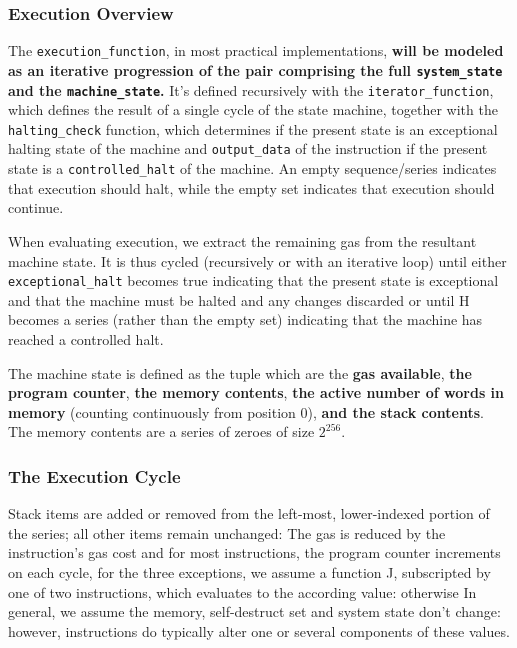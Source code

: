 \documentclass[10pt,letterpaper,leqno,bibliography=totoc]{scrartcl}
\newenvironment{alphafootnotes}
{\par\edef\savedfootnotenumber{\number\value{footnote}}
\renewcommand{\thefootnote}{\alph{footnote}}
\setcounter{footnote}{0}}
{\par\setcounter{footnote}{\savedfootnotenumber}}
\begin{document}
\begin{alphafootnotes}
\begin{multicols*}{2}
				\subsubsection{Execution Overview} The \texttt{execution\_function}, in most practical implementations, \textbf{will be modeled as an iterative progression of the pair comprising the full \texttt{system\_state} and the \texttt{machine\_state}.} It's defined recursively with the \texttt{iterator\_function}, which defines the result of a single cycle of the state machine, together with the \texttt{halting\_check} function, which determines if the present state is an exceptional halting state of the machine and \texttt{output\_data} of the instruction if the present state is a \texttt{controlled\_halt} of the machine. An empty sequence/series indicates that execution should halt, while the empty set indicates that execution should continue.


				When evaluating execution, we extract the remaining gas from the resultant machine state. It is thus cycled (recursively or with an iterative loop) until either \texttt{exceptional\_halt} becomes true indicating that the present state is exceptional and that the machine must be halted and any changes discarded or until H becomes a series (rather than the empty set) indicating that the machine has reached a controlled halt. 
					
				The machine state  is defined as the tuple which are the \textbf{gas available}, \textbf{the program counter}, \textbf{the memory contents}, \textbf{the active number of words in memory} (counting continuously from position 0), \textbf{and the stack contents}. The memory contents are a series of zeroes of size $2^{256}$.\supercite{Wood2017}
				
				\subsubsection{The Execution Cycle} Stack items are added or removed from the left-most, lower-indexed portion of the series; all other items remain unchanged:  The gas is reduced by the instruction’s gas cost and for most instructions, the program counter increments on each cycle, for the three exceptions, we assume a function J, subscripted by one of two instructions, which evaluates to the according value: otherwise In general, we assume the memory, self-destruct set and system state don’t change: however, instructions do typically alter one or several components of these values. 
				

\end{multicols*}
\end{alphafootnotes}
\end{document}
